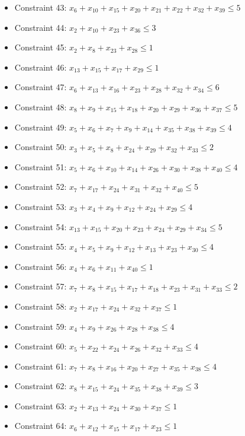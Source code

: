 \documentclass[11pt]{article}
\begin{document}
\begin{itemize}
\item Constraint 43: $x_{6} + x_{10} + x_{15} + x_{20} + x_{21} + x_{22} + x_{32} + x_{39} \le 5$
\item Constraint 44: $x_{2} + x_{10} + x_{23} + x_{36} \le 3$
\item Constraint 45: $x_{2} + x_{8} + x_{23} + x_{28} \le 1$
\item Constraint 46: $x_{13} + x_{15} + x_{17} + x_{29} \le 1$
\item Constraint 47: $x_{6} + x_{13} + x_{16} + x_{23} + x_{28} + x_{32} + x_{34} \le 6$
\item Constraint 48: $x_{8} + x_{9} + x_{15} + x_{18} + x_{20} + x_{29} + x_{36} + x_{37} \le 5$
\item Constraint 49: $x_{5} + x_{6} + x_{7} + x_{9} + x_{14} + x_{35} + x_{38} + x_{39} \le 4$
\item Constraint 50: $x_{3} + x_{5} + x_{8} + x_{24} + x_{29} + x_{32} + x_{33} \le 2$
\item Constraint 51: $x_{5} + x_{6} + x_{10} + x_{14} + x_{26} + x_{30} + x_{38} + x_{40} \le 4$
\item Constraint 52: $x_{7} + x_{17} + x_{24} + x_{31} + x_{32} + x_{40} \le 5$
\item Constraint 53: $x_{3} + x_{4} + x_{9} + x_{12} + x_{24} + x_{29} \le 4$
\item Constraint 54: $x_{13} + x_{15} + x_{20} + x_{23} + x_{24} + x_{29} + x_{34} \le 5$
\item Constraint 55: $x_{4} + x_{5} + x_{9} + x_{12} + x_{13} + x_{23} + x_{30} \le 4$
\item Constraint 56: $x_{4} + x_{6} + x_{11} + x_{40} \le 1$
\item Constraint 57: $x_{7} + x_{8} + x_{15} + x_{17} + x_{18} + x_{23} + x_{31} + x_{33} \le 2$
\item Constraint 58: $x_{2} + x_{17} + x_{24} + x_{32} + x_{37} \le 1$
\item Constraint 59: $x_{4} + x_{9} + x_{26} + x_{28} + x_{38} \le 4$
\item Constraint 60: $x_{5} + x_{22} + x_{24} + x_{26} + x_{32} + x_{33} \le 4$
\item Constraint 61: $x_{7} + x_{8} + x_{16} + x_{20} + x_{27} + x_{35} + x_{38} \le 4$
\item Constraint 62: $x_{8} + x_{15} + x_{24} + x_{35} + x_{38} + x_{39} \le 3$
\item Constraint 63: $x_{2} + x_{13} + x_{24} + x_{30} + x_{37} \le 1$
\item Constraint 64: $x_{6} + x_{12} + x_{15} + x_{17} + x_{23} \le 1$

\end{itemize}
\end{document}
